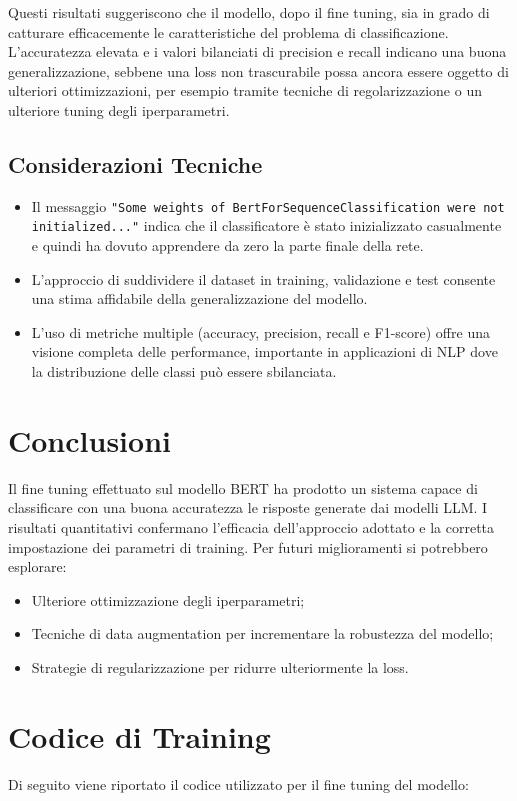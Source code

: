 \documentclass[11pt,a4paper]{article}
\begin{document}
Questi risultati suggeriscono che il modello, dopo il fine tuning, sia in grado di catturare efficacemente le caratteristiche del problema di classificazione. L'accuratezza elevata e i valori bilanciati di precision e recall indicano una buona generalizzazione, sebbene una loss non trascurabile possa ancora essere oggetto di ulteriori ottimizzazioni, per esempio tramite tecniche di regolarizzazione o un ulteriore tuning degli iperparametri.

\subsection{Considerazioni Tecniche}
\begin{itemize}
    \item Il messaggio \texttt{"Some weights of BertForSequenceClassification were not initialized..."} indica che il classificatore è stato inizializzato casualmente e quindi ha dovuto apprendere da zero la parte finale della rete.
    \item L'approccio di suddividere il dataset in training, validazione e test consente una stima affidabile della generalizzazione del modello.
    \item L'uso di metriche multiple (accuracy, precision, recall e F1-score) offre una visione completa delle performance, importante in applicazioni di NLP dove la distribuzione delle classi può essere sbilanciata.
\end{itemize}

\section{Conclusioni}
Il fine tuning effettuato sul modello BERT ha prodotto un sistema capace di classificare con una buona accuratezza le risposte generate dai modelli LLM. I risultati quantitativi confermano l'efficacia dell'approccio adottato e la corretta impostazione dei parametri di training. Per futuri miglioramenti si potrebbero esplorare:
\begin{itemize}
    \item Ulteriore ottimizzazione degli iperparametri;
    \item Tecniche di data augmentation per incrementare la robustezza del modello;
    \item Strategie di regularizzazione per ridurre ulteriormente la loss.
\end{itemize}

\section*{Codice di Training}
Di seguito viene riportato il codice utilizzato per il fine tuning del modello:
\end{document}
